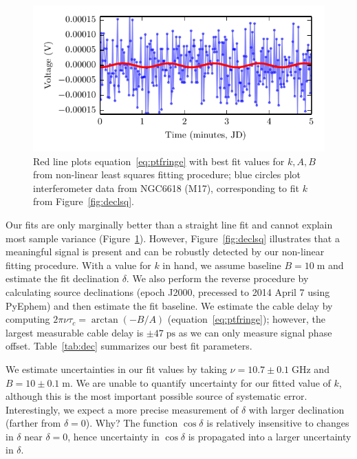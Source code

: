 \documentclass[10pt]{article}
\newcommand {\mt}{\mathrm}
\newcommand {\unit}[1]{\; \mt{#1}}
\begin{document}
\begin{figure}[!ht]
    \centering
    \includegraphics{plots_fitting/M17_dec_fits_signal.pdf}
    \caption{Red line plots equation~\ref{eq:ptfringe} with best fit values for $k,A,B$ from non-linear least squares fitting procedure; blue circles plot interferometer data from NGC6618 (M17), corresponding to fit $k$ from Figure~\ref{fig:declsq}.}
    \label{fig:decsig}
\end{figure}

Our fits are only marginally better than a straight line fit and cannot explain most sample variance (Figure~\ref{fig:decsig}).  However, Figure~\ref{fig:declsq} illustrates that a meaningful signal is present and can be robustly detected by our non-linear fitting procedure.  With a value for $k$ in hand, we assume baseline $B = 10 \unit{m}$ and estimate the fit declination $\delta$.  We also perform the reverse procedure by calculating source declinations (epoch J2000, precessed to 2014 April 7 using PyEphem) and then estimate the fit baseline.  We estimate the cable delay by computing $2\pi\nu\tau_c = \arctan(-B/A)$ (equation~\ref{eq:ptfringe}); however, the largest measurable cable delay is $\pm 47 \unit{ps}$ as we can only measure signal phase offset.  Table~\ref{tab:dec} summarizes our best fit parameters.

We estimate uncertainties in our fit values by taking $\nu = 10.7 \pm 0.1 \unit{GHz}$ and $B = 10 \pm 0.1 \unit{m}$.  We are unable to quantify uncertainty for our fitted value of $k$, although this is the most important possible source of systematic error.  Interestingly, we expect a more precise measurement of $\delta$ with larger declination (farther from $\delta=0$).  Why?  The function $\cos\delta$ is relatively insensitive to changes in $\delta$ near $\delta=0$, hence uncertainty in $\cos\delta$ is propagated into a larger uncertainty in $\delta$.
\end{document}
